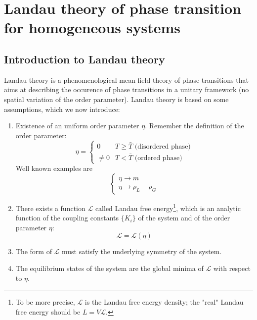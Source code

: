 \documentclass[../../Main/Main.tex]{subfiles}
\begin{document}
\chapter{Landau theory of phase transition for homogeneous systems}

\section{Introduction to Landau theory}

Landau theory is a phenomenological mean field theory of phase transitions  that aims at describing the occurence of phase transitions in a unitary framework (no spatial variation of the order parameter). Landau theory is based on some assumptions, which we now introduce:
\begin{enumerate}
\item Existence of an uniform order parameter \( \eta   \). Remember the definition of the order parameter:
\begin{equation*}
  \eta   = \begin{cases}
    0 & T \ge \bar{T} \text{ (disordered phase)}\\
    \neq 0 & T < \bar{T}  \text{ (ordered phase)}
\end{cases}
\end{equation*}
Well known examples are
\begin{equation*}
  \begin{cases}
   \eta \rightarrow m \\
  \eta  \rightarrow \rho _L - \rho _G
  \end{cases}
\end{equation*}

\item There exists a function \( \mathcal{L} \)  called Landau free energy\footnote{To be more precise,  \( \mathcal{L} \) is the Landau free energy density; the "real" Landau free energy should be  \( L = V \mathcal{L}  \).}, which is an analytic function of the coupling constants \( \{ K_i\} \) of the system and of the order parameter \( \eta  \):
\begin{equation*}
  \mathcal{L} = \mathcal{L} (\eta )
\end{equation*}

\item The form of \( \mathcal{L} \) must satisfy the underlying symmetry of the system.
\item The equilibrium states of the system are the global minima of \( \mathcal{L} \) with respect to  \( \eta  \).

\end{enumerate}
\end{document}
